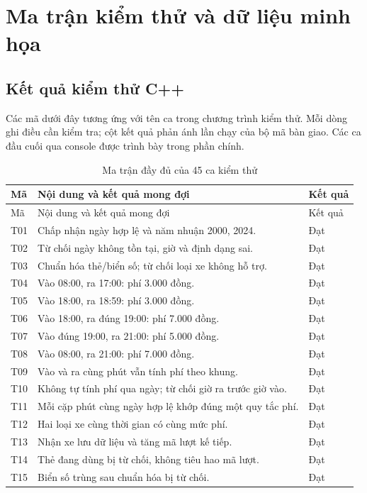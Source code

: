 \chapter{Ma trận kiểm thử và dữ liệu minh họa}
\label{app:tests}

\section{Kết quả kiểm thử C++}
Các mã dưới đây tương ứng với tên ca trong chương trình kiểm thử. Mỗi dòng ghi điều cần kiểm tra; cột kết quả phản ánh lần chạy của bộ mã bàn giao. Các ca đầu cuối qua console được trình bày trong phần chính.

\begingroup\small
\begin{longtable}{p{0.85cm} p{11.9cm} p{1.2cm}}
\caption{Ma trận đầy đủ của 45 ca kiểm thử}\label{tab:all-tests}\\
\toprule Mã & Nội dung và kết quả mong đợi & Kết quả\\\midrule
\endfirsthead
\toprule Mã & Nội dung và kết quả mong đợi & Kết quả\\\midrule
\endhead
\bottomrule\endfoot
T01 & Chấp nhận ngày hợp lệ và năm nhuận 2000, 2024. & Đạt\\
T02 & Từ chối ngày không tồn tại, giờ và định dạng sai. & Đạt\\
T03 & Chuẩn hóa thẻ/biển số; từ chối loại xe không hỗ trợ. & Đạt\\
T04 & Vào 08:00, ra 17:00: phí 3.000 đồng. & Đạt\\
T05 & Vào 18:00, ra 18:59: phí 3.000 đồng. & Đạt\\
T06 & Vào 18:00, ra đúng 19:00: phí 7.000 đồng. & Đạt\\
T07 & Vào đúng 19:00, ra 21:00: phí 5.000 đồng. & Đạt\\
T08 & Vào 08:00, ra 21:00: phí 7.000 đồng. & Đạt\\
T09 & Vào và ra cùng phút vẫn tính phí theo khung. & Đạt\\
T10 & Không tự tính phí qua ngày; từ chối giờ ra trước giờ vào. & Đạt\\
T11 & Mỗi cặp phút cùng ngày hợp lệ khớp đúng một quy tắc phí. & Đạt\\
T12 & Hai loại xe cùng thời gian có cùng mức phí. & Đạt\\
T13 & Nhận xe lưu dữ liệu và tăng mã lượt kế tiếp. & Đạt\\
T14 & Thẻ đang dùng bị từ chối, không tiêu hao mã lượt. & Đạt\\
T15 & Biển số trùng sau chuẩn hóa bị từ chối. & Đạt\\

\end{longtable}
